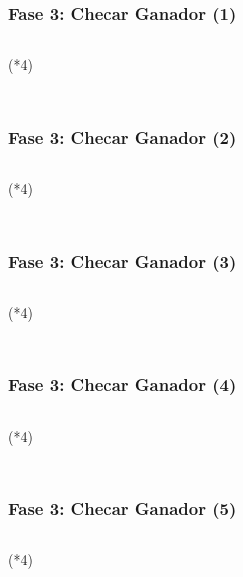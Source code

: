 \begin{frame}[fragile]
\frametitle{Fase 3: Checar Ganador (1)} 
\begin{columns}
\begin{block}{(*4)}
\inputminted[linenos,fontsize=\tiny]{kotlin}{00_ComportamientoAplicacionTicTacToe/MostrarAlertDialog.kt}
\end{block}
\end{columns}
\end{frame}

\begin{frame}[fragile]
\frametitle{Fase 3: Checar Ganador (2)} 
\begin{columns}
\begin{block}{(*4)}
\inputminted[linenos,fontsize=\tiny]{kotlin}{00_ComportamientoAplicacionTicTacToe/ChecarGanadorPorFilas.kt}
\end{block}
\end{columns}
\end{frame}

\begin{frame}[fragile]
\frametitle{Fase 3: Checar Ganador (3)} 
\begin{columns}
\begin{block}{(*4)}
\inputminted[linenos,fontsize=\tiny]{kotlin}{00_ComportamientoAplicacionTicTacToe/ChecarGanadorPorColumnas.kt}
\end{block}
\end{columns}
\end{frame}


\begin{frame}[fragile]
\frametitle{Fase 3: Checar Ganador (4)} 
\begin{columns}
\begin{block}{(*4)}
\inputminted[linenos,fontsize=\tiny]{kotlin}{00_ComportamientoAplicacionTicTacToe/ChecarGanadorPorDiagonales.kt}
\end{block}
\end{columns}
\end{frame}

\begin{frame}[fragile]
\frametitle{Fase 3: Checar Ganador (5)} 
\begin{columns}
\begin{block}{(*4)}
\inputminted[linenos,fontsize=\tiny]{kotlin}{00_ComportamientoAplicacionTicTacToe/ChecarAlgunGanadorFin.kt}
\end{block}
\end{columns}
\end{frame}

